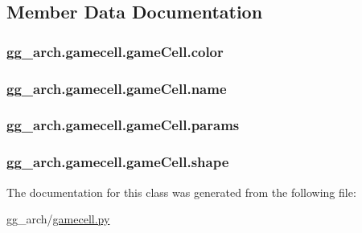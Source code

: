 \subsection{Member Data Documentation}
\hypertarget{classgg__arch_1_1gamecell_1_1game_cell_ae87be21f16d1f9d0225e4826ccd46e1b}{
\subsubsection[{color}]{\setlength{\rightskip}{0pt plus 5cm}gg\-\_\-arch.\-gamecell.\-game\-Cell.\-color}}\label{classgg__arch_1_1gamecell_1_1game_cell_ae87be21f16d1f9d0225e4826ccd46e1b}
\hypertarget{classgg__arch_1_1gamecell_1_1game_cell_ada75b7dbbea4a61dc10b6227a43d0f78}{
\subsubsection[{name}]{\setlength{\rightskip}{0pt plus 5cm}gg\-\_\-arch.\-gamecell.\-game\-Cell.\-name}}\label{classgg__arch_1_1gamecell_1_1game_cell_ada75b7dbbea4a61dc10b6227a43d0f78}
\hypertarget{classgg__arch_1_1gamecell_1_1game_cell_aae0a2c4e1e821fee5c4d6d298840e403}{
\subsubsection[{params}]{\setlength{\rightskip}{0pt plus 5cm}gg\-\_\-arch.\-gamecell.\-game\-Cell.\-params}}\label{classgg__arch_1_1gamecell_1_1game_cell_aae0a2c4e1e821fee5c4d6d298840e403}
\hypertarget{classgg__arch_1_1gamecell_1_1game_cell_a68355a86a7580f16ade2446991f2a4b3}{
\subsubsection[{shape}]{\setlength{\rightskip}{0pt plus 5cm}gg\-\_\-arch.\-gamecell.\-game\-Cell.\-shape}}\label{classgg__arch_1_1gamecell_1_1game_cell_a68355a86a7580f16ade2446991f2a4b3}


The documentation for this class was generated from the following file\-:\begin{DoxyCompactItemize}
\item 
gg\-\_\-arch/\hyperlink{gamecell_8py}{gamecell.\-py}\end{DoxyCompactItemize}
